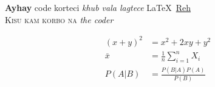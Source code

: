 \documentclass{article}
\begin{document}
\textbf{Ayhay} code korteci \textit{khub vala lagtece}
\LaTeX\ \underline{Reh}\\
\textsc{Kisu kam korbo na}
\emph{the coder}\\
\newpage

\begin{align}
    (x+y)^2 &= x^2 + 2xy + y^2\\
    \bar{x} &= \frac{1}{n} \sum_{i=1}^n X_i\\
    P(A|B) &= \frac{P(B|A)P(A)}{P(B)}\\
\end{align}
\end{document}
